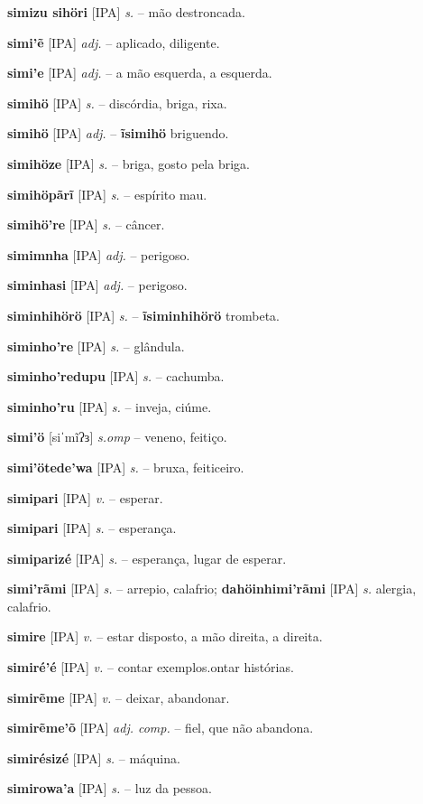 \textbf{simizu sihöri} [IPA] \textit{s.} -- mão destroncada.

\textbf{simi'ẽ} [IPA] \textit{adj.} -- aplicado, diligente.

\textbf{simi'e} [IPA] \textit{adj.} -- a mão esquerda, a esquerda.

\textbf{simihö} [IPA] \textit{s.} -- discórdia, briga, rixa.

\textbf{simihö} [IPA] \textit{adj.} -- \textbf{ĩsimihö} briguendo.

\textbf{simihöze} [IPA] \textit{s.} -- briga, gosto pela briga.

\textbf{simihöpãrĩ} [IPA] \textit{s.} -- espírito mau.

\textbf{simihö're} [IPA] \textit{s.} -- câncer.

\textbf{simimnha} [IPA] \textit{adj.} -- perigoso.

\textbf{siminhasi} [IPA] \textit{adj.} -- perigoso.

\textbf{siminhihörö} [IPA] \textit{s.} -- \textbf{ĩsiminhihörö} trombeta.

\textbf{siminho're} [IPA] \textit{s.} -- glândula.

\textbf{siminho'redupu} [IPA] \textit{s.} -- cachumba.

\textbf{siminho'ru} [IPA] \textit{s.} -- inveja, ciúme.

\textbf{simi'ö} [siˈmĩʔɜ] \textit{s.omp} -- veneno, feitiço.

\textbf{simi'ötede'wa} [IPA] \textit{s.} -- bruxa, feiticeiro.

\textbf{simipari} [IPA] \textit{v.} -- esperar.

\textbf{simipari} [IPA] \textit{s.} -- esperança.

\textbf{simiparizé} [IPA] \textit{s.} -- esperança, lugar de esperar.

\textbf{simi'rãmi} [IPA] \textit{s.} -- arrepio, calafrio; \textbf{dahöinhimi'rãmi} [IPA] \textit{s.} alergia, calafrio.

\textbf{simire} [IPA] \textit{v.} -- estar disposto, a mão direita, a direita.

\textbf{simiré'é} [IPA] \textit{v.} -- contar exemplos.ontar histórias.

\textbf{simirẽme} [IPA] \textit{v.} -- deixar, abandonar.

\textbf{simirẽme'õ} [IPA] \textit{adj. comp.} -- fiel, que não abandona.

\textbf{simirésizé} [IPA] \textit{s.} -- máquina.

\textbf{simirowa'a} [IPA] \textit{s.} -- luz da pessoa.

